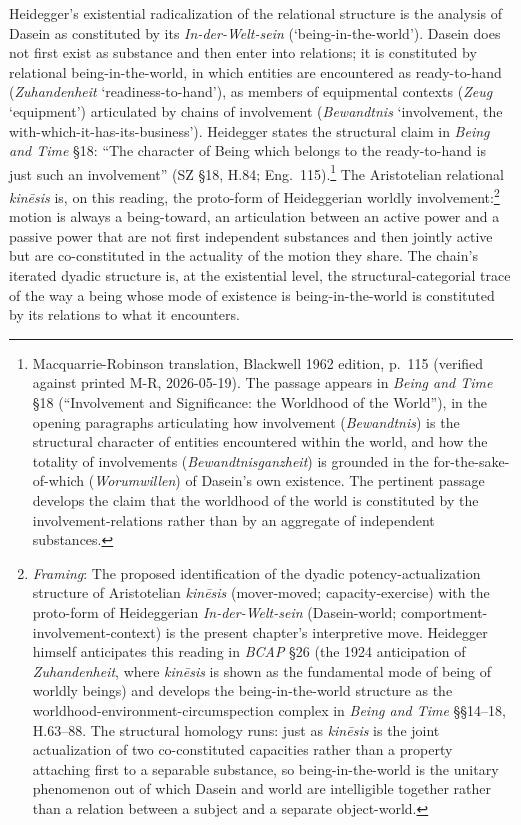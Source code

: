 \documentclass{article}
\begin{document}
Heidegger's existential radicalization of the relational structure is the analysis of Dasein as constituted by its \textit{In-der-Welt-sein} (`being-in-the-world'). Dasein does not first exist as substance and then enter into relations; it is constituted by relational being-in-the-world, in which entities are encountered as ready-to-hand (\textit{Zuhandenheit} `readiness-to-hand'), as members of equipmental contexts (\textit{Zeug} `equipment') articulated by chains of involvement (\textit{Bewandtnis} `involvement, the with-which-it-has-its-business'). Heidegger states the structural claim in \textit{Being and Time} \S 18: ``The character of Being which belongs to the ready-to-hand is just such an involvement'' (SZ \S 18, H.84; Eng.~115).\footnote{Macquarrie-Robinson translation, Blackwell 1962 edition, p.~115 (verified against printed M-R, 2026-05-19). The passage appears in \textit{Being and Time} \S 18 (``Involvement and Significance: the Worldhood of the World''), in the opening paragraphs articulating how involvement (\textit{Bewandtnis}) is the structural character of entities encountered within the world, and how the totality of involvements (\textit{Bewandtnisganzheit}) is grounded in the for-the-sake-of-which (\textit{Worumwillen}) of Dasein's own existence. The pertinent passage develops the claim that the worldhood of the world is constituted by the involvement-relations rather than by an aggregate of independent substances.} The Aristotelian relational \textit{kinēsis} is, on this reading, the proto-form of Heideggerian worldly involvement:\footnote{\textit{Framing}: The proposed identification of the dyadic potency-actualization structure of Aristotelian \textit{kin\=esis} (mover-moved; capacity-exercise) with the proto-form of Heideggerian \textit{In-der-Welt-sein} (Dasein-world; comportment-involvement-context) is the present chapter's interpretive move. Heidegger himself anticipates this reading in \textit{BCAP} §26 (the 1924 anticipation of \textit{Zuhandenheit}, where \textit{kin\=esis} is shown as the fundamental mode of being of worldly beings) and develops the being-in-the-world structure as the worldhood-environment-circumspection complex in \textit{Being and Time} §§14--18, H.63--88. The structural homology runs: just as \textit{kin\=esis} is the joint actualization of two co-constituted capacities rather than a property attaching first to a separable substance, so being-in-the-world is the unitary phenomenon out of which Dasein and world are intelligible together rather than a relation between a subject and a separate object-world.} motion is always a being-toward, an articulation between an active power and a passive power that are not first independent substances and then jointly active but are co-constituted in the actuality of the motion they share. The chain's iterated dyadic structure is, at the existential level, the structural-categorial trace of the way a being whose mode of existence is being-in-the-world is constituted by its relations to what it encounters.
\end{document}
